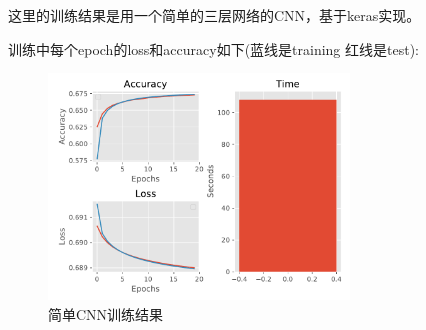 \documentclass[11pt, a4paper]{article}
\begin{document}
这里的训练结果是用一个简单的三层网络的CNN，基于keras实现。

训练中每个epoch的loss和accuracy如下(蓝线是training 红线是test):

 \begin{figure}[htbp]
	
	\centering %
	\includegraphics[width=8cm]{training}
	
	\caption{简单CNN训练结果}
	\label{Fig:training}
	
\end{figure}


  
% 





\end{document}

